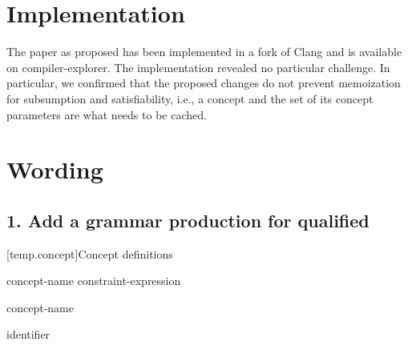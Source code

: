 \documentclass{wg21}
\begin{document}
\section{Implementation}


The paper as proposed has been implemented in a fork of Clang and is available on compiler-explorer.
The implementation revealed no particular challenge. In particular, we confirmed that the proposed changes
do not prevent memoization for subsumption and satisfiability, i.e., a concept and the set of its concept parameters
are what needs to be cached.

\section{Wording}

\subsection{\textcolor{noteclr}{1. Add a grammar production for qualified }}


[temp.concept]{Concept definitions}

\begin{bnf}
    \br
     concept-name  \terminal{=} constraint-expression \terminal{;}
\end{bnf}

\begin{addedblock}
\begin{bnf}
    \br
     concept-name
\end{bnf}
\end{addedblock}

\begin{bnf}
    \br
    identifier
\end{bnf}


\begin{bnf}
    \br
    \br
\end{bnf}

\begin{bnf}
    \br
    \br
     \terminal{<}  \terminal{>}
\end{bnf}
\end{document}
